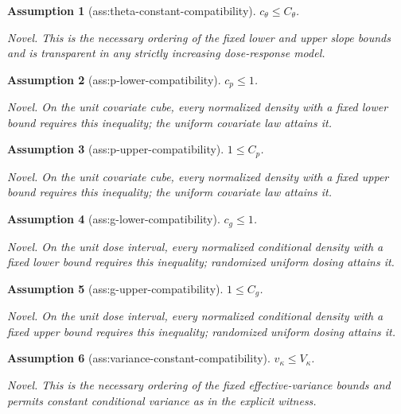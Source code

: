\documentclass{article}
\newtheorem{assumption}{Assumption}
\begin{document}
\begin{assumption}[ass:theta-constant-compatibility]\label{ass:theta-constant-compatibility}
\(c_{\theta}\le C_{\theta}\).
\par\smallskip\noindent\emph{Novel.} This is the necessary ordering of the fixed lower and upper slope bounds and is transparent in any strictly increasing dose-response model.
\end{assumption}

\begin{assumption}[ass:p-lower-compatibility]\label{ass:p-lower-compatibility}
\(c_p\le1\).
\par\smallskip\noindent\emph{Novel.} On the unit covariate cube, every normalized density with a fixed lower bound requires this inequality; the uniform covariate law attains it.
\end{assumption}

\begin{assumption}[ass:p-upper-compatibility]\label{ass:p-upper-compatibility}
\(1\le C_p\).
\par\smallskip\noindent\emph{Novel.} On the unit covariate cube, every normalized density with a fixed upper bound requires this inequality; the uniform covariate law attains it.
\end{assumption}

\begin{assumption}[ass:g-lower-compatibility]\label{ass:g-lower-compatibility}
\(c_g\le1\).
\par\smallskip\noindent\emph{Novel.} On the unit dose interval, every normalized conditional density with a fixed lower bound requires this inequality; randomized uniform dosing attains it.
\end{assumption}

\begin{assumption}[ass:g-upper-compatibility]\label{ass:g-upper-compatibility}
\(1\le C_g\).
\par\smallskip\noindent\emph{Novel.} On the unit dose interval, every normalized conditional density with a fixed upper bound requires this inequality; randomized uniform dosing attains it.
\end{assumption}

\begin{assumption}[ass:variance-constant-compatibility]\label{ass:variance-constant-compatibility}
\(v_{\kappa}\le V_{\kappa}\).
\par\smallskip\noindent\emph{Novel.} This is the necessary ordering of the fixed effective-variance bounds and permits constant conditional variance as in the explicit witness.
\end{assumption}
\end{document}
